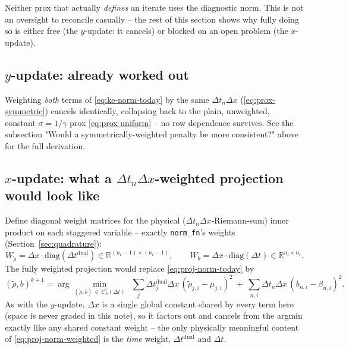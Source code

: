 \documentclass[11pt]{article}
\newcommand{\eps}{\varepsilon}
\newcommand{\dt}{\Delta t}
\newcommand{\dx}{\Delta x}
\newcommand{\RR}{\mathbb{R}}
\newcommand{\Ch}{\mathcal{C}^\eps_h}
\newcommand{\code}[1]{\texttt{#1}}
\begin{document}
Neither prox that actually \emph{defines} an iterate uses the diagnostic norm. This is not an
oversight to reconcile casually -- the rest of this section shows why fully doing so is either
free (the $y$-update: it cancels) or blocked on an open problem (the $x$-update).

\subsection*{$y$-update: already worked out}

Weighting \emph{both} terms of \eqref{eq:ke-norm-today} by the same $\dt_n\dx$
(\eqref{eq:prox-symmetric}) cancels identically, collapsing back to the plain, unweighted,
constant-$\sigma=1/\gamma$ prox \eqref{eq:prox-uniform} -- no row dependence survives. See the
subsection "Would a symmetrically-weighted penalty be more consistent?" above for the full
derivation.

\subsection*{$x$-update: what a $\dt_n\dx$-weighted projection would look like}

Define diagonal weight matrices for the physical ($\dt_n\dx$-Riemann-sum) inner product on each
staggered variable -- exactly \code{norm\_fn}'s weights (Section~\ref{sec:quadrature}):
\begin{equation}
  W_{\tilde\rho} = \dx\cdot\mathrm{diag}(\dt^{\mathrm{dual}}) \in\RR^{(n_t-1)\times(n_t-1)},
  \qquad
  W_b = \dx\cdot\mathrm{diag}(\dt) \in\RR^{n_t\times n_t}.
\end{equation}
The fully weighted projection would replace \eqref{eq:proj-norm-today} by
\begin{equation}
  \label{eq:proj-norm-weighted}
  (\tilde\rho,b)^{k+1} = \arg\min_{(\tilde\rho,b)\,\in\,\Ch(\dt)}\ \
  \sum_j \dt_j^{\mathrm{dual}}\dx\,(\tilde\rho_{j,i}-\mu_{j,i})^2
  \ + \ \sum_{n,i} \dt_n\dx\,(b_{n,i}-\beta_{n,i})^2.
\end{equation}
As with the $y$-update, $\dx$ is a single global constant shared by every term here (space is
never graded in this note), so it factors out and cancels from the argmin exactly like any shared
constant weight -- the only physically meaningful content of \eqref{eq:proj-norm-weighted} is the
\emph{time} weight, $\dt^{\mathrm{dual}}$ and $\dt$.
\end{document}
